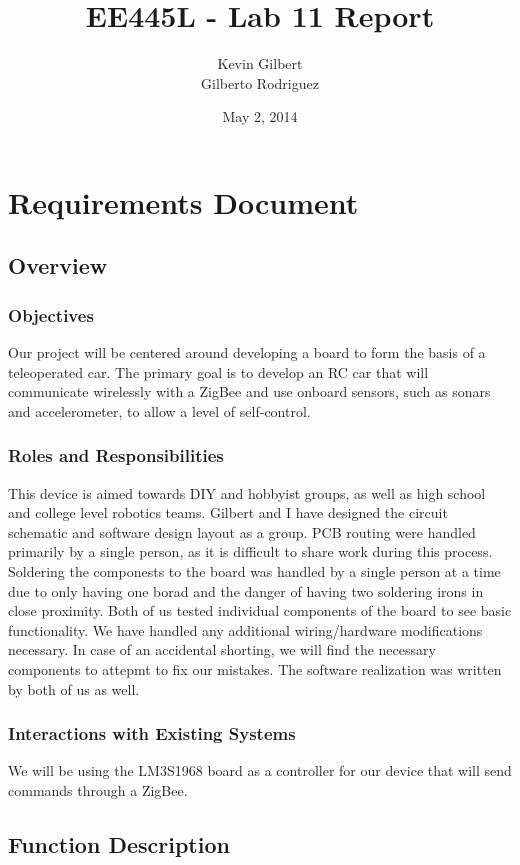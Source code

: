 \documentclass[twoside]{article}
\title{EE445L - Lab 11 Report}
\author{Kevin Gilbert\\ Gilberto Rodriguez}
\date{May 2, 2014}
\begin{document}
\raggedbottom
\maketitle{}

\section{Requirements Document}
\subsection{Overview}
\subsubsection{Objectives}
Our project will be centered around developing a board to form the basis of a teleoperated car. The primary goal is to develop an RC car that will communicate wirelessly with a ZigBee and use onboard sensors, such as sonars and accelerometer,  to allow a level of self-control.
\subsubsection{Roles and Responsibilities}
This device is aimed towards DIY and hobbyist groups, as well as high school and college level robotics teams. Gilbert and I have designed the circuit schematic and software design layout as a group. PCB routing were handled primarily by a single person, as it is difficult to share work during this process. Soldering the componests to the board was handled by a single person at a time due to only having one borad and the danger of having two soldering irons in close proximity. Both of us tested individual components of the board to see basic functionality. We have handled any additional wiring/hardware modifications necessary. In case of an accidental shorting, we will find the necessary components to attepmt to fix our mistakes. The software realization was written by both of us as well. 
\subsubsection{Interactions with Existing Systems}
We will be using the LM3S1968 board as a controller for our device that will send commands through a ZigBee.
\subsection{Function Description}
\end{document}
